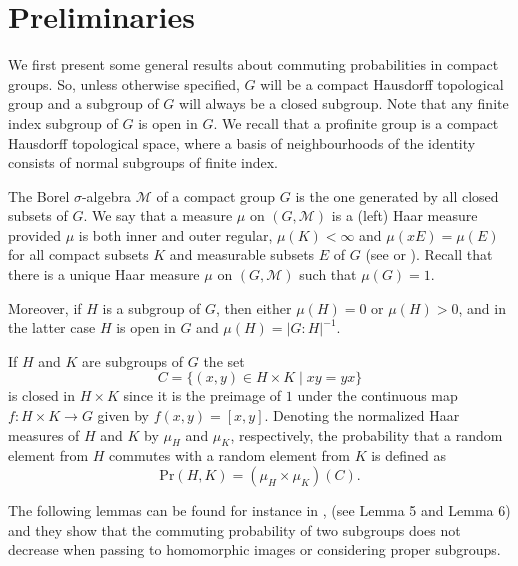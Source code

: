 \documentclass[12pt]{amsart}
\newcommand{\pr }{\mathrm{Pr} }
\begin{document}
 
\section{Preliminaries} 

We first present some general results about commuting probabilities in compact groups. So, unless otherwise specified, $G$ will be a compact Hausdorff topological group and a subgroup of $G$ will always be a closed subgroup. Note that any finite index subgroup of $G$ is open in $G$. We recall  that a profinite group  is a  compact  Hausdorff topological space, where a basis of  neighbourhoods of the identity consists of normal subgroups of finite index. 
 
The Borel $\sigma$-algebra $\mathcal M$ of a compact group $G$ is the one generated by all closed subsets of $G$. We say that a measure $\mu$ on $(G,\mathcal M)$ is a (left) Haar measure provided $\mu$ is both inner and outer regular, $\mu(K) < \infty$ and $\mu(xE) = \mu(E)$ for all compact subsets $K$ and measurable subsets $E$ of $G$ (see \cite[Chapter 4]{HR} or \cite[Chapter II]{Nach}). Recall that there is a unique Haar measure $\mu$ on $(G,\mathcal M)$ such that $\mu(G) = 1$. 

Moreover, if $H$ is a subgroup of $G$, then either $\mu(H) =0$ or $\mu(H) >0$, and in the latter case $H$ is open in $G$ and $\mu(H)=|G:H|^{-1}.$

If $H$ and $K$ are  subgroups of $G$ the
set 
\[C = \{(x, y) \in H \times K \mid xy = yx\}\]  is closed in $H \times K$ since it is the  preimage of $1$ under the continuous map $f : H\times K \rightarrow G$ given by $f(x, y) = [x, y]$.
Denoting the normalized Haar measures of $H$ and $K$ by $\mu_H$ and $\mu_K$, respectively, the probability that a random element from $H$ commutes with a random element from $K$ is defined as 
 \[\pr(H,K) = (\mu_H \times \mu_K)(C).\]

%
%
	
The following lemmas can be found for instance in \cite{MZ}, (see Lemma 5 and Lemma 6) and they show that the commuting probability of two subgroups does not decrease when passing to homomorphic images or considering proper subgroups.
\end{document}
